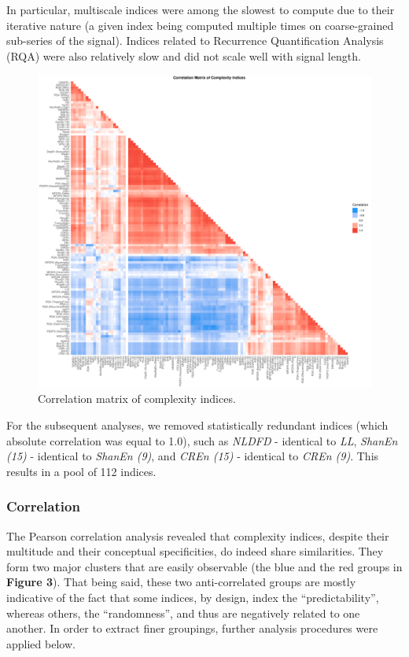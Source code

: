 \documentclass[
  man]{apa6}
\begin{document}
In particular, multiscale indices were among the slowest to compute due to their iterative nature (a given index being computed multiple times on coarse-grained sub-series of the signal). Indices related to Recurrence Quantification Analysis (RQA) were also relatively slow and did not scale well with signal length.

\begin{figure}
\centering
\includegraphics{./figures/correlation-1.pdf}
\caption{\label{fig:correlation}Correlation matrix of complexity indices.}
\end{figure}

For the subsequent analyses, we removed statistically redundant indices (which absolute correlation was equal to 1.0), such as \emph{NLDFD} - identical to \emph{LL}, \emph{ShanEn (15)} - identical to \emph{ShanEn (9)}, and \emph{CREn (15)} - identical to \emph{CREn (9)}. This results in a pool of 112 indices.

\hypertarget{correlation}{%
\subsubsection{Correlation}\label{correlation}}

The Pearson correlation analysis revealed that complexity indices, despite their multitude and their conceptual specificities, do indeed share similarities. They form two major clusters that are easily observable (the blue and the red groups in \textbf{Figure 3}). That being said, these two anti-correlated groups are mostly indicative of the fact that some indices, by design, index the ``predictability'', whereas others, the ``randomness'', and thus are negatively related to one another. In order to extract finer groupings, further analysis procedures were applied below.
\end{document}
